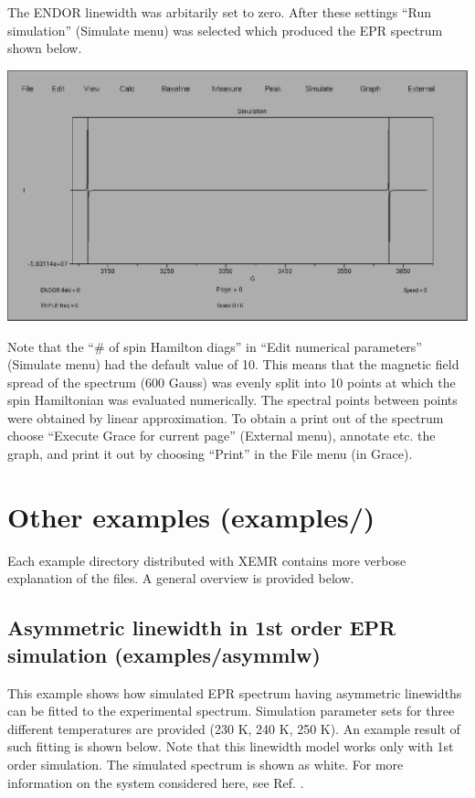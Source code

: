\documentclass[byrevtex,amssymb,aps,pra,floatfix,letterpaper]{revtex4}
\begin{document}
\noindent
The ENDOR linewidth was arbitarily set to zero. After these settings ``Run simulation'' (Simulate menu) was selected which produced the EPR spectrum shown below.

\begin{center}
\includegraphics[scale=0.4]{fig7}
\end{center}

\noindent
Note that the ``\# of spin Hamilton diags'' in ``Edit numerical parameters'' (Simulate menu) had the default value of 10. This means that the magnetic field spread of the spectrum (600 Gauss) was evenly split into 10 points at which the spin Hamiltonian was evaluated numerically. The spectral points between points were obtained by linear approximation. To obtain a print out of the spectrum choose ``Execute Grace for current page'' (External menu), annotate etc. the graph, and print it out by choosing ``Print'' in the File menu (in Grace).

\section{Other examples (examples/)}

Each example directory distributed with XEMR contains more verbose explanation of the files. A general overview is provided below.

\subsection{Asymmetric linewidth in 1st order EPR simulation (examples/asymmlw)}

This example shows how simulated EPR spectrum having asymmetric linewidths can be fitted to the experimental spectrum. Simulation parameter sets for three different temperatures are provided (230 K, 240 K, 250 K). An example result of such fitting is shown below. Note that this linewidth model works only with 1st order simulation. The simulated spectrum is shown as white. For more information on the system considered here, see Ref. \cite{eloranta}.
\end{document}
